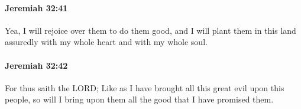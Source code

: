 		\paragraph{Jeremiah 32:41} %
			\label{JEREMIAH-32-41}

			Yea, I will rejoice over them to do them good, and I will plant them in this land assuredly with my whole heart and with my whole soul.


		\paragraph{Jeremiah 32:42} %
			\label{JEREMIAH-32-42}

			For thus saith the LORD; Like as I have brought all this great evil upon this people, so will I bring upon them all the good that I have promised them.


